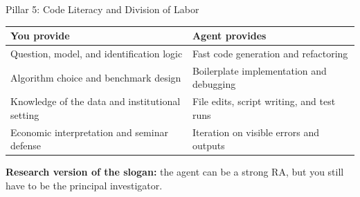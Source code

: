 \documentclass[10pt,english,aspectratio=169]{beamer}
\begin{document}
\begin{frame}{Pillar 5: Code Literacy and Division of Labor}
\begin{center}
\small
\begin{tabular}{|p{5.5cm}|p{5.9cm}|}
\hline
\textbf{You provide} & \textbf{Agent provides} \\ \hline
Question, model, and identification logic & Fast code generation and refactoring \\ \hline
Algorithm choice and benchmark design & Boilerplate implementation and debugging \\ \hline
Knowledge of the data and institutional setting & File edits, script writing, and test runs \\ \hline
Economic interpretation and seminar defense & Iteration on visible errors and outputs \\ \hline
\end{tabular}
\end{center}

\vspace{0.25cm}

\textbf{Research version of the slogan:} the agent can be a strong RA, but you still have to be the principal investigator.
\end{frame}
\end{document}
